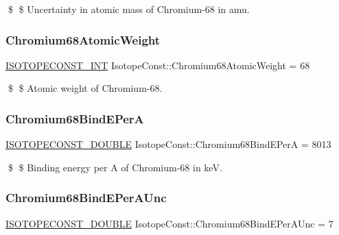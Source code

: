 \$ \$ Uncertainty in atomic mass of Chromium-\/68 in amu. \mbox{\label{group___isotope_const-_chromium-_cr68_ga0705369aeb6ce8d96ebf54c302bc6d21}} 
\subsubsection{\texorpdfstring{Chromium68\+Atomic\+Weight}{Chromium68AtomicWeight}}
{\footnotesize\ttfamily \mbox{\hyperlink{group___isotope_const-_macros_ga5f18360b3e99483a35c32d789e62621c}{I\+S\+O\+T\+O\+P\+E\+C\+O\+N\+S\+T\+\_\+\+I\+NT}} Isotope\+Const\+::\+Chromium68\+Atomic\+Weight = 68}

\$ \$ Atomic weight of Chromium-\/68. \mbox{\label{group___isotope_const-_chromium-_cr68_ga331404e3b81dfa4752ef4bbb311eba5a}} 
\subsubsection{\texorpdfstring{Chromium68\+Bind\+E\+PerA}{Chromium68BindEPerA}}
{\footnotesize\ttfamily \mbox{\hyperlink{group___isotope_const-_macros_ga8f45a7272ce02c0b4c65c44636ed719a}{I\+S\+O\+T\+O\+P\+E\+C\+O\+N\+S\+T\+\_\+\+D\+O\+U\+B\+LE}} Isotope\+Const\+::\+Chromium68\+Bind\+E\+PerA = 8013}

\$ \$ Binding energy per A of Chromium-\/68 in keV. \mbox{\label{group___isotope_const-_chromium-_cr68_gaae283dac2a15e6760900dfdda30dc78b}} 
\subsubsection{\texorpdfstring{Chromium68\+Bind\+E\+Per\+A\+Unc}{Chromium68BindEPerAUnc}}
{\footnotesize\ttfamily \mbox{\hyperlink{group___isotope_const-_macros_ga8f45a7272ce02c0b4c65c44636ed719a}{I\+S\+O\+T\+O\+P\+E\+C\+O\+N\+S\+T\+\_\+\+D\+O\+U\+B\+LE}} Isotope\+Const\+::\+Chromium68\+Bind\+E\+Per\+A\+Unc = 7}

